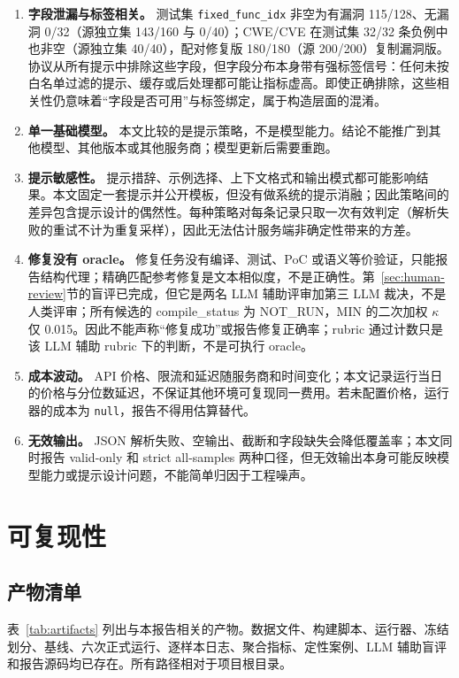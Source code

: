 \documentclass[conference]{IEEEtran}
\begin{document}
\begin{enumerate}
    \item \textbf{字段泄漏与标签相关。} 测试集 \texttt{fixed\_func\_idx} 非空为有漏洞 115/128、无漏洞 0/32（源独立集 143/160 与 0/40）；CWE/CVE 在测试集 32/32 条负例中也非空（源独立集 40/40），配对修复版 180/180（源 200/200）复制漏洞版。协议从所有提示中排除这些字段，但字段分布本身带有强标签信号：任何未按白名单过滤的提示、缓存或后处理都可能让指标虚高。即使正确排除，这些相关性仍意味着“字段是否可用”与标签绑定，属于构造层面的混淆。
    \item \textbf{单一基础模型。} 本文比较的是提示策略，不是模型能力。结论不能推广到其他模型、其他版本或其他服务商；模型更新后需要重跑。
    \item \textbf{提示敏感性。} 提示措辞、示例选择、上下文格式和输出模式都可能影响结果。本文固定一套提示并公开模板，但没有做系统的提示消融；因此策略间的差异包含提示设计的偶然性。每种策略对每条记录只取一次有效判定（解析失败的重试不计为重复采样），因此无法估计服务端非确定性带来的方差。
    \item \textbf{修复没有 oracle。} 修复任务没有编译、测试、PoC 或语义等价验证，只能报告结构代理；精确匹配参考修复是文本相似度，不是正确性。第~\ref{sec:human-review}节的盲评已完成，但它是两名 LLM 辅助评审加第三 LLM 裁决，不是人类评审；所有候选的 compile\_status 为 NOT\_RUN，MIN 的二次加权 $\kappa$ 仅 0.015。因此不能声称“修复成功”或报告修复正确率；rubric 通过计数只是该 LLM 辅助 rubric 下的判断，不是可执行 oracle。
    \item \textbf{成本波动。} API 价格、限流和延迟随服务商和时间变化；本文记录运行当日的价格与分位数延迟，不保证其他环境可复现同一费用。若未配置价格，运行器的成本为 \texttt{null}，报告不得用估算替代。
    \item \textbf{无效输出。} JSON 解析失败、空输出、截断和字段缺失会降低覆盖率；本文同时报告 valid-only 和 strict all-samples 两种口径，但无效输出本身可能反映模型能力或提示设计问题，不能简单归因于工程噪声。
\end{enumerate}

\section{可复现性}
\label{sec:reproducibility}
\subsection{产物清单}
表~\ref{tab:artifacts} 列出与本报告相关的产物。数据文件、构建脚本、运行器、冻结划分、基线、六次正式运行、逐样本日志、聚合指标、定性案例、LLM 辅助盲评和报告源码均已存在。所有路径相对于项目根目录。
\end{document}
